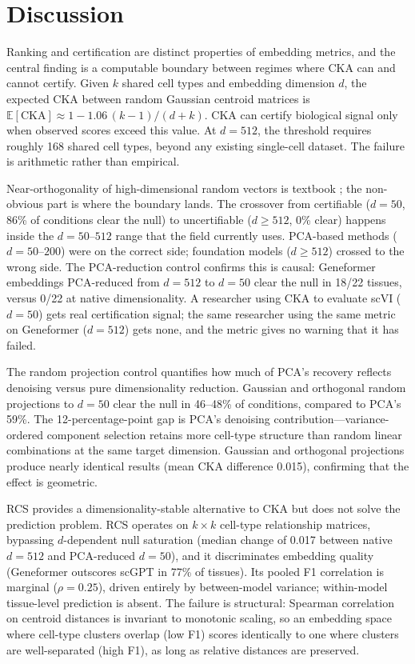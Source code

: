 \documentclass[11pt]{article}
\begin{document}
\section{Discussion}
\label{sec:discussion}

Ranking and certification are distinct properties of embedding metrics,
and the central finding is a computable boundary between regimes where
CKA can and cannot certify. Given $k$ shared cell types and embedding
dimension $d$, the expected CKA between random Gaussian centroid
matrices is $\mathbb{E}[\mathrm{CKA}] \approx 1 -
1.06\,(k{-}1)/(d{+}k)$. CKA can certify biological signal only when
observed scores exceed this value. At $d = 512$, the threshold requires
roughly 168 shared cell types, beyond any existing single-cell dataset.
The failure is arithmetic rather than empirical.

Near-orthogonality of high-dimensional random vectors is textbook
\citep{johnsonlindenstrauss1984}; the non-obvious part is where the
boundary lands. The crossover from certifiable ($d = 50$, 86\% of
conditions clear the null) to uncertifiable ($d \geq 512$, 0\% clear)
happens inside the $d = 50$--$512$ range that the field currently uses.
PCA-based methods ($d = 50$--$200$) were on the correct side; foundation
models ($d \geq 512$) crossed to the wrong side. The PCA-reduction
control confirms this is causal: Geneformer embeddings PCA-reduced from
$d = 512$ to $d = 50$ clear the null in 18/22 tissues, versus 0/22 at
native dimensionality. A researcher using CKA to evaluate scVI
($d = 50$) gets real certification signal; the same researcher using the
same metric on Geneformer ($d = 512$) gets none, and the metric gives no
warning that it has failed.

The random projection control quantifies how much of PCA's recovery
reflects denoising versus pure dimensionality reduction. Gaussian and
orthogonal random projections to $d = 50$ clear the null in 46--48\%
of conditions, compared to PCA's 59\%. The 12-percentage-point gap is
PCA's denoising contribution---variance-ordered component selection
retains more cell-type structure than random linear combinations at
the same target dimension. Gaussian and orthogonal projections produce
nearly identical results (mean CKA difference 0.015), confirming that
the effect is geometric.

RCS provides a dimensionality-stable alternative to CKA but does not
solve the prediction problem. RCS operates on $k \times k$ cell-type
relationship matrices, bypassing $d$-dependent null saturation (median
change of 0.017 between native $d = 512$ and PCA-reduced $d = 50$),
and it discriminates embedding quality (Geneformer outscores scGPT in
77\% of tissues). Its pooled F1 correlation is marginal
($\rho = 0.25$), driven entirely by between-model variance; within-model
tissue-level prediction is absent. The failure is structural: Spearman
correlation on centroid distances is invariant to monotonic scaling, so
an embedding space where cell-type clusters overlap (low F1) scores
identically to one where clusters are well-separated (high F1), as long
as relative distances are preserved.
\end{document}
